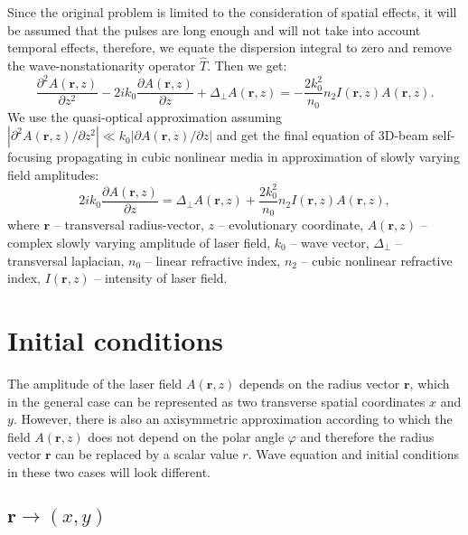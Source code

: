 \documentclass[a4paper, 12pt]{article}
\begin{document}
Since the original problem is limited to the consideration of spatial effects, it will be assumed that the pulses are long enough and will not take into account temporal effects, therefore, we equate the dispersion integral to zero and remove the wave-nonstationarity operator $\hat{T}$. Then we get:
\begin{equation}
\label{eqn:approx_final}
\frac{\partial^2 A (\mathbf{r}, z)}{\partial z^2} - 2 i k_0 \frac{\partial A (\mathbf{r}, z)}{\partial z} + \Delta_{\perp} A (\mathbf{r}, z)= - \frac{2 k_0^2}{n_0} n_2 I(\mathbf{r}, z) A(\mathbf{r}, z).
\end{equation}
We use the quasi-optical approximation assuming $| \partial^2 A(\mathbf{r}, z) / \partial z^2| \ll k_0 |\partial A(\mathbf{r},z) / \partial z|$ and get the final equation of 3D-beam self-focusing  propagating in cubic nonlinear media in approximation of slowly varying field amplitudes:
\begin{equation}
\label{eqn:final}
2 i k_0 \frac{\partial A (\mathbf{r}, z)}{\partial z} = \Delta_{\perp} A (\mathbf{r}, z) + \frac{2 k_0^2}{n_0} n_2 I(\mathbf{r}, z) A(\mathbf{r}, z),
\end{equation}
where $\mathbf{r}$ -- transversal radius-vector, $z$ -- evolutionary coordinate, $A(\mathbf{r},z)$ -- complex slowly varying amplitude of laser field, $k_0$ -- wave vector, $\Delta_\perp$ -- transversal laplacian, $n_0$ -- linear refractive index, $n_2$ -- cubic nonlinear refractive index, $I(\mathbf{r},z)$ -- intensity of laser field. 

\section{Initial conditions}

The amplitude of the laser field $A(\mathbf{r},z)$ depends on the radius vector $\mathbf{r}$, which in the general case can be represented as two transverse spatial coordinates $x$ and $y$. However, there is also an axisymmetric approximation according to which the field $A(\mathbf{r},z)$ does not depend on the polar angle $\varphi$ and therefore the radius vector $\mathbf{r}$ can be replaced by a scalar value $r$. Wave equation and initial conditions in these two cases will look different.

\subsection{$\mathbf{r}\longrightarrow(x,y)$}
\end{document}
